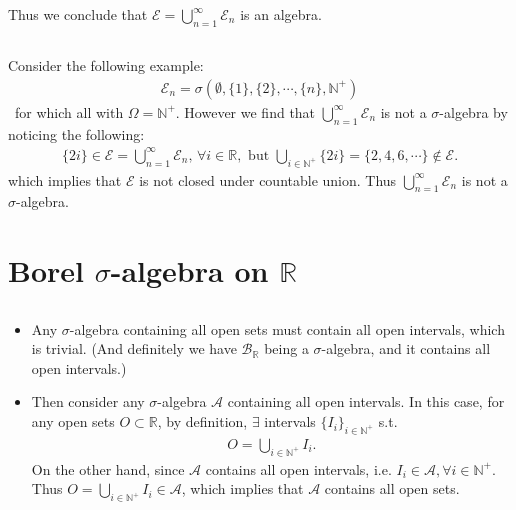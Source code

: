 \documentclass[11pt,a4paper]{article}
\numberwithin{equation}{section}%
\begin{document}
Thus we conclude that $ \mathcal{E}=\bigcup_{n=1}^\infty \mathcal{E}_n $ is an algebra.

\subsection{}


Consider the following example:
\begin{align*}
    \mathcal{E}_n = \sigma (\emptyset, \{1\}, \{2\}, \cdots, \{n\}, \mathbb{N}^+)
\end{align*}\
for which all with $ \Omega =\mathbb{N}^+ $. However we find that $ \bigcup_{n=1}^\infty \mathcal{E}_n $ is not a $ \sigma $-algebra by noticing the following:
\begin{align*}
    \{2i\} \in  \mathcal{E}=\bigcup_{n=1}^\infty \mathcal{E}_n,\,\forall i\in\mathbb{R},\text{ but } \bigcup_{i\in \mathbb{N}^+} \{2i\} = \{2,4,6,\cdots\}\notin \mathcal{E}.
\end{align*}
which implies that $ \mathcal{E} $ is not closed under countable union. Thus $ \bigcup_{n=1}^\infty \mathcal{E}_n $ is not a $ \sigma $-algebra.




\section{Borel $ \sigma  $-algebra on $ \mathbb{R} $}

\subsection{}\label{openintervals}

\begin{itemize}[topsep=2pt,itemsep=0pt]
    \item Any $ \sigma $-algebra containing all open sets must contain all open intervals, which is trivial. (And definitely we have $ \mathcal{B}_\mathbb{R} $ being a $ \sigma $-algebra, and it contains all open intervals.)
    \item Then consider any $ \sigma $-algebra $ \mathcal{A} $ containing all open intervals. In this case, for any open sets $ O \subset \mathbb{R} $, by definition, $ \exists $ intervals $ \{I_i\}_{i\in\mathbb{N}^+} $ s.t.
    \begin{align*}
        O=\bigcup_{i\in \mathbb{N}^+} I_i. 
    \end{align*}
    On the other hand, since $ \mathcal{A} $ contains all open intervals, i.e. $ I_i\in \mathcal{A}, \forall i\in \mathbb{N}^+ $. Thus $ O = \bigcup_{i\in \mathbb{N}^+} I_i\in \mathcal{A} $, which implies that $ \mathcal{A} $ contains all open sets. 
\end{itemize}
\end{document}
